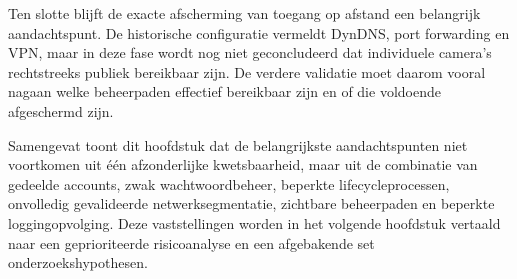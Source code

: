 Ten slotte blijft de exacte afscherming van toegang op afstand een belangrijk aandachtspunt. De historische configuratie vermeldt DynDNS, port forwarding en VPN, maar in deze fase wordt nog niet geconcludeerd dat individuele camera's rechtstreeks publiek bereikbaar zijn. De verdere validatie moet daarom vooral nagaan welke beheerpaden effectief bereikbaar zijn en of die voldoende afgeschermd zijn.

Samengevat toont dit hoofdstuk dat de belangrijkste aandachtspunten niet voortkomen uit één afzonderlijke kwetsbaarheid, maar uit de combinatie van gedeelde accounts, zwak wachtwoordbeheer, beperkte lifecycleprocessen, onvolledig gevalideerde netwerksegmentatie, zichtbare beheerpaden en beperkte loggingopvolging. Deze vaststellingen worden in het volgende hoofdstuk vertaald naar een geprioriteerde risicoanalyse en een afgebakende set onderzoekshypothesen.
